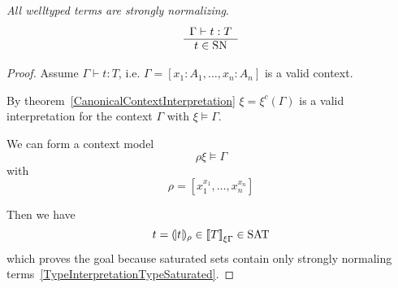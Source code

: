 \begin{theorem}
    \label{StrongNormalizationProof}
    \emph{All welltyped terms are strongly normalizing}.
    $$
    \begin{array}{c} 
        \Gamma \vdash t : T
     \\ \hline 
        t \in \text{SN}
    \end{array}
    $$


    \begin{proof}
        Assume $\Gamma \vdash t : T$, i.e. $\Gamma = [x_1 : A_1, \ldots, x_n :
        A_n]$ is a valid context.

        By theorem~\ref{CanonicalContextInterpretation} $\xi = \xi^c(\Gamma)$ is
        a valid interpretation for the context $\Gamma$ with $\xi \vDash
        \Gamma$.

        We can form a context model
        $$
        \rho\xi \vDash \Gamma
        $$
        with
        $$
        \rho = [x_1^{x_1}, \ldots, x_n^{x_n}]
        $$

        Then we have
        $$
        t = {(\!|t|\!)_{\rho}} \in {{[\![}T{]\!]}}_{\xi\Gamma} \in \text{SAT}
        $$
        which proves the goal because saturated sets contain only strongly
        normaling terms~\ref{TypeInterpretationTypeSaturated}.
    \end{proof}
\end{theorem}
